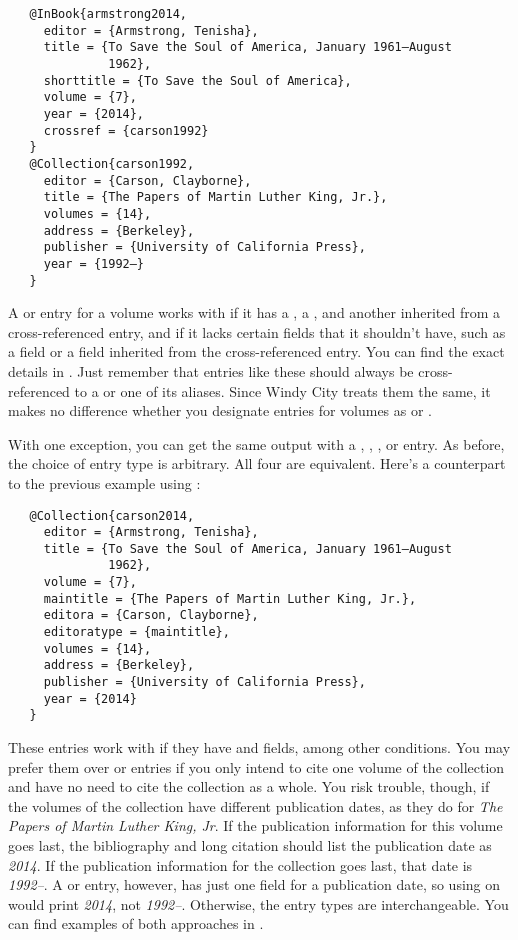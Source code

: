 \documentclass[11pt,letterpaper,oneside]{article}
\begin{document}
\begin{verbatim}
   @InBook{armstrong2014,
     editor = {Armstrong, Tenisha},
     title = {To Save the Soul of America, January 1961–August
              1962},
     shorttitle = {To Save the Soul of America},
     volume = {7},
     year = {2014},
     crossref = {carson1992}
   }
   @Collection{carson1992,
     editor = {Carson, Clayborne},
     title = {The Papers of Martin Luther King, Jr.},
     volumes = {14},
     address = {Berkeley},
     publisher = {University of California Press},
     year = {1992–}
   }
\end{verbatim}

A  or  entry for a volume works
with  if it has a , a ,
and another  inherited from a cross-referenced entry,
and if it lacks certain fields that it shouldn't have, such as a
 field or a  field inherited from
the cross-referenced entry. You can find the exact details in
. Just remember that entries like these should
always be cross-referenced to a  or one of its
aliases. Since Windy City treats them the same, it makes no difference
whether you designate entries for volumes as  or
.

With one exception, you can get the same output with a ,
, , or 
entry. As before, the choice of entry type is arbitrary. All four are
equivalent. Here's a counterpart to the previous example using
:

\begin{verbatim}
   @Collection{carson2014,
     editor = {Armstrong, Tenisha},
     title = {To Save the Soul of America, January 1961–August
              1962},
     volume = {7},
     maintitle = {The Papers of Martin Luther King, Jr.},
     editora = {Carson, Clayborne},
     editoratype = {maintitle},
     volumes = {14},
     address = {Berkeley},
     publisher = {University of California Press},
     year = {2014}
   }
\end{verbatim}

These entries work with  if they have 
and  fields, among other conditions. You may
prefer them over  or  entries if
you only intend to cite one volume of the collection and have no need
to cite the collection as a whole. You risk trouble, though, if the
volumes of the collection have different publication dates, as they do
for \textit{The Papers of Martin Luther King, Jr}. If the publication
information for this volume goes last, the bibliography and long
citation should list the publication date as \textit{2014}. If the
publication information for the collection goes last, that date is
\textit{1992–}. A  or  entry,
however, has just one field for a publication date, so using
 on  would print \textit{2014}, not
\textit{1992–}. Otherwise, the entry types are interchangeable. You
can find examples of both approaches in .
\end{document}
